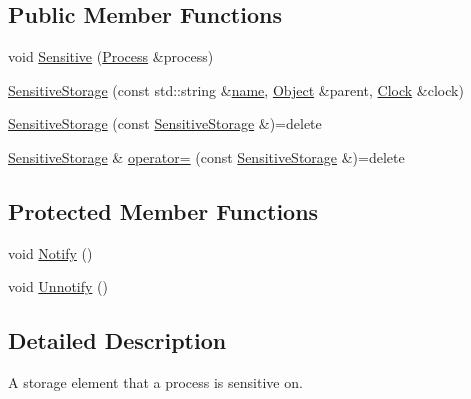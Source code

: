 \subsection*{Public Member Functions}
\begin{DoxyCompactItemize}
\item 
void \hyperlink{class_simulator_1_1_sensitive_storage_ad22ed987e43065a7e34f4a471503dcd6}{Sensitive} (\hyperlink{class_simulator_1_1_process}{Process} \&process)
\item 
\hyperlink{class_simulator_1_1_sensitive_storage_a9f50b4f179da2cf8fd3377e9a64dce34}{Sensitive\+Storage} (const std\+::string \&\hyperlink{mtconf_8c_a8f8f80d37794cde9472343e4487ba3eb}{name}, \hyperlink{class_simulator_1_1_object}{Object} \&parent, \hyperlink{class_simulator_1_1_clock}{Clock} \&clock)
\item 
\hyperlink{class_simulator_1_1_sensitive_storage_aefd1600596c1bd1b44557484d3eceef4}{Sensitive\+Storage} (const \hyperlink{class_simulator_1_1_sensitive_storage}{Sensitive\+Storage} \&)=delete
\item 
\hyperlink{class_simulator_1_1_sensitive_storage}{Sensitive\+Storage} \& \hyperlink{class_simulator_1_1_sensitive_storage_a76145c8dd00d54ff9b0a7242e68f8331}{operator=} (const \hyperlink{class_simulator_1_1_sensitive_storage}{Sensitive\+Storage} \&)=delete
\end{DoxyCompactItemize}
\subsection*{Protected Member Functions}
\begin{DoxyCompactItemize}
\item 
void \hyperlink{class_simulator_1_1_sensitive_storage_ab0b16bd967d02bc89729a8f45b972939}{Notify} ()
\item 
void \hyperlink{class_simulator_1_1_sensitive_storage_ad47ffb0fd204f560b872c30edf23f0fa}{Unnotify} ()
\end{DoxyCompactItemize}


\subsection{Detailed Description}
A storage element that a process is sensitive on. 

